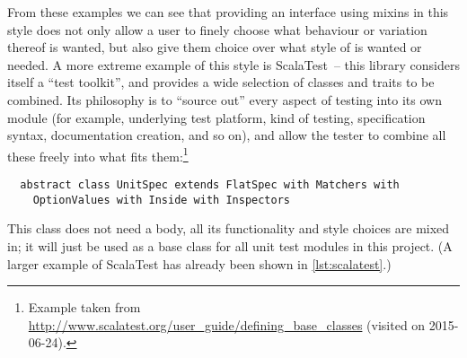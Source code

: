 From these examples we can see that providing an interface using mixins in this style does not only
allow a user to finely choose what behaviour or variation thereof is wanted, but also give them
choice over what style of \dsl{} is wanted or needed. A more extreme example of this style is
ScalaTest~-- this library considers itself a \enquote{test toolkit}, and provides a wide selection
of classes and traits to be combined. Its philosophy is to \enquote{source out} every aspect of
testing into its own module (for example, underlying test platform, kind of testing, specification
syntax, documentation creation, and so on), and allow the tester to combine all these freely into
what fits them:\footnote{Example taken from
  \protect\url{http://www.scalatest.org/user_guide/defining_base_classes} (visited on 2015-06-24).}
\begin{lstlisting}
  abstract class UnitSpec extends FlatSpec with Matchers with
    OptionValues with Inside with Inspectors
\end{lstlisting}
This class does not need a body, all its functionality and style choices are mixed in; it will just
be used as a base class for all unit test modules in this project. (A larger example of ScalaTest
has already been shown in \autoref{lst:scalatest}.)

% 






